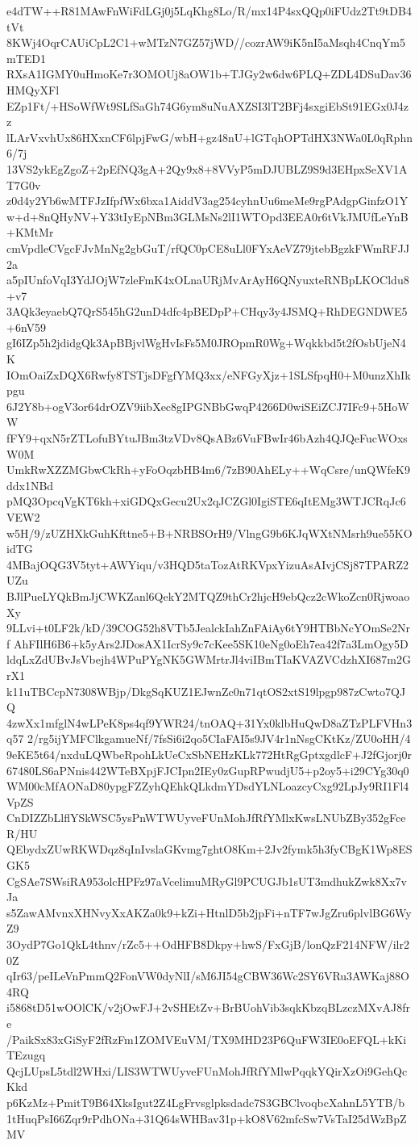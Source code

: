e4dTW++R81MAwFnWiFdLGj0j5LqKhg8Lo/R/mx14P4sxQQp0iFUdz2Tt9tDB4tVt
8KWj4OqrCAUiCpL2C1+wMTzN7GZ57jWD//cozrAW9iK5nI5aMsqh4CnqYm5mTED1
RXsA1IGMY0uHmoKe7r3OMOUj8aOW1b+TJGy2w6dw6PLQ+ZDL4DSuDav36HMQyXFl
EZp1Ft/+HSoWfWt9SLfSaGh74G6ym8uNuAXZSI3lT2BFj4sxgiEbSt91EGx0J4zz
lLArVxvhUx86HXxnCF6lpjFwG/wbH+gz48nU+lGTqhOPTdHX3NWa0L0qRphn6/7j
13VS2ykEgZgoZ+2pEfNQ3gA+2Qy9x8+8VVyP5mDJUBLZ9S9d3EHpxSeXV1AT7G0v
z0d4y2Yb6wMTFJzIfpfWx6bxa1AiddV3ag254cyhnUu6meMe9rgPAdgpGinfzO1Y
w+d+8nQHyNV+Y33tIyEpNBm3GLMsNs2lI1WTOpd3EEA0r6tVkJMUfLeYnB+KMtMr
cmVpdleCVgcFJvMnNg2gbGuT/rfQC0pCE8uLl0FYxAeVZ79jtebBgzkFWmRFJJ2a
a5pIUnfoVqI3YdJOjW7zleFmK4xOLnaURjMvArAyH6QNyuxteRNBpLKOCldu8+v7
3AQk3eyaebQ7QrS545hG2unD4dfc4pBEDpP+CHqy3y4JSMQ+RhDEGNDWE5+6nV59
gI6IZp5h2jdidgQk3ApBBjvlWgHvIsFs5M0JROpmR0Wg+Wqkkbd5t2fOsbUjeN4K
IOmOaiZxDQX6Rwfy8TSTjsDFgfYMQ3xx/eNFGyXjz+1SLSfpqH0+M0unzXhIkpgu
6J2Y8b+ogV3or64drOZV9iibXec8gIPGNBbGwqP4266D0wiSEiZCJ7IFc9+5HoWW
fFY9+qxN5rZTLofuBYtuJBm3tzVDv8QsABz6VuFBwIr46bAzh4QJQeFucWOxsW0M
UmkRwXZZMGbwCkRh+yFoOqzbHB4m6/7zB90AhELy++WqCsre/unQWfeK9ddx1NBd
pMQ3OpcqVgKT6kh+xiGDQxGecu2Ux2qJCZGl0IgiSTE6qItEMg3WTJCRqJc6VEW2
w5H/9/zUZHXkGuhKfttne5+B+NRBSOrH9/VlngG9b6KJqWXtNMsrh9ue55KOidTG
4MBajOQG3V5tyt+AWYiqu/v3HQD5taTozAtRKVpxYizuAsAIvjCSj87TPARZ2UZu
BJlPueLYQkBmJjCWKZanl6QekY2MTQZ9thCr2hjcH9ebQcz2cWkoZcn0RjwoaoXy
9LLvi+t0LF2k/kD/39COG52h8VTb5JealckIahZnFAiAy6tY9HTBbNcYOmSe2Nrf
AhFIlH6B6+k5yArs2JDosAX1IcrSy9c7cKee5SK10eNg0oEh7ea42f7a3LmOgy5D
ldqLxZdUBvJsVbejh4WPuPYgNK5GWMrtrJl4viIBmTIaKVAZVCdzhXI687m2GrX1
k11uTBCcpN7308WBjp/DkgSqKUZ1EJwnZc0n71qtOS2xtS19lpgp987zCwto7QJQ
4zwXx1mfglN4wLPeK8ps4qf9YWR24/tnOAQ+31Yx0klbHuQwD8aZTzPLFVHn3q57
2/rg5ijYMFClkgamueNf/7fsSi6i2qo5CIaFAI5s9JV4r1nNsgCKtKz/ZU0oHH/4
9eKE5t64/nxduLQWbeRpohLkUeCxSbNEHzKLk772HtRgGptxgdlcF+J2fGjorj0r
67480LS6aPNnis442WTeBXpjFJCIpn2IEy0zGupRPwudjU5+p2oy5+i29CYg30q0
WM00cMfAONaD80ypgFZZyhQEhkQLkdmYDsdYLNLoazcyCxg92LpJy9RI1Fl4VpZS
CnDIZZbLlflYSkWSC5ysPnWTWUyveFUnMohJfRfYMlxKwsLNUbZBy352gFceR/HU
QEbydxZUwRKWDqz8qInIvslaGKvmg7ghtO8Km+2Jv2fymk5h3fyCBgK1Wp8ESGK5
CgSAe7SWsiRA953olcHPFz97aVcelimuMRyGl9PCUGJb1sUT3mdhukZwk8Xx7vJa
s5ZawAMvnxXHNvyXxAKZa0k9+kZi+HtnlD5b2jpFi+nTF7wJgZru6plvlBG6WyZ9
3OydP7Go1QkL4thnv/rZc5++OdHFB8Dkpy+hwS/FxGjB/lonQzF214NFW/ilr20Z
qIr63/peILeVnPmmQ2FonVW0dyNlI/sM6JI54gCBW36Wc2SY6VRu3AWKaj88O4RQ
i5868tD51wOOlCK/v2jOwFJ+2vSHEtZv+BrBUohVib3sqkKbzqBLzczMXvAJ8fre
/PaikSx83xGiSyF2fRzFm1ZOMVEuVM/TX9MHD23P6QuFW3IE0oEFQL+kKiTEzugq
QcjLUpsL5tdl2WHxi/LIS3WTWUyveFUnMohJfRfYMlwPqqkYQirXzOi9GehQcKkd
p6KzMz+PmitT9B64XksIgut2Z4LgFrvsglpksdadc7S3GBClvoqbcXahnL5YTB/b
1tHuqPsI66Zqr9rPdhONa+31Q64sWHBav31p+kO8V62mfcSw7VsTaI25dWzBpZMV
